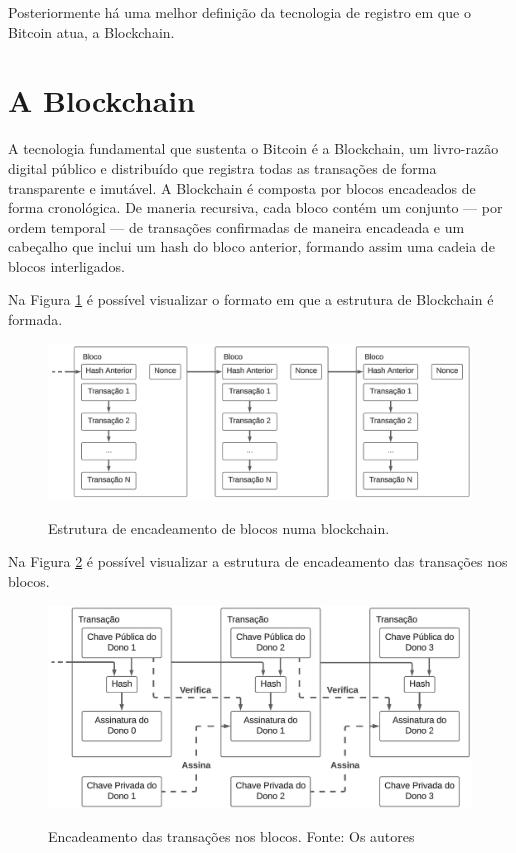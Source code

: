 Posteriormente há uma melhor definição da tecnologia de registro em que o Bitcoin atua, a Blockchain.

\section*{A Blockchain} \label{subsec:blockchain}
A tecnologia fundamental que sustenta o Bitcoin é a Blockchain, um livro-razão digital público e distribuído que registra todas as transações de forma transparente e imutável. A Blockchain é composta por blocos encadeados de forma cronológica. De maneria recursiva, cada bloco contém um conjunto — por ordem temporal — de transações confirmadas de maneira encadeada e um cabeçalho que inclui um hash do bloco anterior, formando assim uma cadeia de blocos interligados.

Na Figura \ref*{fig:blockchain} é possível visualizar o formato em que a estrutura de Blockchain é formada.

\begin{figure} [h]
    \centering
        \caption{Estrutura de encadeamento de blocos numa blockchain.}
        \includegraphics[width=.8\linewidth]{images/figura 2.png}
        \label{fig:blockchain}
\end{figure}

Na Figura \ref*{fig:transactions} é possível visualizar a estrutura de encadeamento das transações nos blocos.

\begin{figure} [h]
    \centering
        \caption{Encadeamento das transações nos blocos. Fonte: Os autores}
        \includegraphics[width=.8\linewidth]{images/figura 1.png}
        \label{fig:transactions}

\end{figure} 

